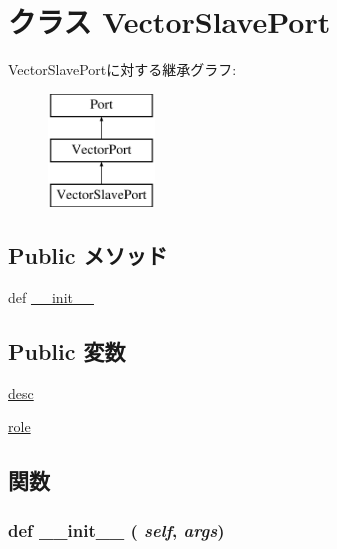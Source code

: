 \hypertarget{classm5_1_1params_1_1VectorSlavePort}{
\section{クラス VectorSlavePort}
\label{classm5_1_1params_1_1VectorSlavePort}
}
VectorSlavePortに対する継承グラフ:\begin{figure}[H]
\begin{center}
\leavevmode
\includegraphics[height=3cm]{classm5_1_1params_1_1VectorSlavePort}
\end{center}
\end{figure}
\subsection*{Public メソッド}
\begin{DoxyCompactItemize}
\item 
def \hyperlink{classm5_1_1params_1_1VectorSlavePort_ac775ee34451fdfa742b318538164070e}{\_\-\_\-init\_\-\_\-}
\end{DoxyCompactItemize}
\subsection*{Public 変数}
\begin{DoxyCompactItemize}
\item 
\hyperlink{classm5_1_1params_1_1VectorSlavePort_aafc566bb08a9f46485e7238669581c2b}{desc}
\item 
\hyperlink{classm5_1_1params_1_1VectorSlavePort_a4e0cdb878325d53ad79a74504bf97a96}{role}
\end{DoxyCompactItemize}


\subsection{関数}
\hypertarget{classm5_1_1params_1_1VectorSlavePort_ac775ee34451fdfa742b318538164070e}{
\subsubsection[{\_\-\_\-init\_\-\_\-}]{\setlength{\rightskip}{0pt plus 5cm}def \_\-\_\-init\_\-\_\- ( {\em self}, \/   {\em args})}}
\label{classm5_1_1params_1_1VectorSlavePort_ac775ee34451fdfa742b318538164070e}


